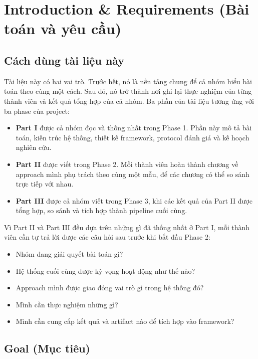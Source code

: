 \chapter{Introduction \& Requirements (Bài toán và yêu cầu)}

\section{Cách dùng tài liệu này}

Tài liệu này có hai vai trò. Trước hết, nó là nền tảng chung để cả nhóm hiểu bài toán theo cùng một cách. Sau đó, nó trở thành nơi ghi lại thực nghiệm của từng thành viên và kết quả tổng hợp của cả nhóm. Ba phần của tài liệu tương ứng với ba phase của project:

\begin{itemize}
  \item \textbf{Part I} được cả nhóm đọc và thống nhất trong Phase 1. Phần này mô tả bài toán, kiến trúc hệ thống, thiết kế framework, protocol đánh giá và kế hoạch nghiên cứu.
  \item \textbf{Part II} được viết trong Phase 2. Mỗi thành viên hoàn thành chương về approach mình phụ trách theo cùng một mẫu, để các chương có thể so sánh trực tiếp với nhau.
  \item \textbf{Part III} được cả nhóm viết trong Phase 3, khi các kết quả của Part II được tổng hợp, so sánh và tích hợp thành pipeline cuối cùng.
\end{itemize}

Vì Part II và Part III đều dựa trên những gì đã thống nhất ở Part I, mỗi thành viên cần tự trả lời được các câu hỏi sau trước khi bắt đầu Phase 2:

\begin{itemize}
  \item Nhóm đang giải quyết bài toán gì?
  \item Hệ thống cuối cùng được kỳ vọng hoạt động như thế nào?
  \item Approach mình được giao đóng vai trò gì trong hệ thống đó?
  \item Mình cần thực nghiệm những gì?
  \item Mình cần cung cấp kết quả và artifact nào để tích hợp vào framework?
\end{itemize}

\section{Goal (Mục tiêu)}

